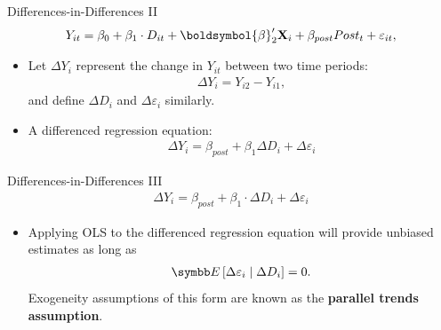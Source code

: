 \documentclass[aspectratio=169,11pt]{beamer}
\begin{document}
\begin{frame}{Differences-in-Differences II}
\begin{align*}
  Y_{it}=\beta_{0}+\beta_{1}\cdot D_{it}+\boldsymbol{\beta}_2' {\bf X}_{i} + \beta_{post}  Post_t  + \varepsilon_{it},
\end{align*}

\begin{itemize}
  \item Let $\Delta Y_{i}$ represent the change in $Y_{it}$ between two time periods:
  \begin{align*}
  \Delta Y_{i} = Y_{i2} - Y_{i1},
  \end{align*}
  and define $\Delta D_i$ and $\Delta \varepsilon_i$ similarly.

  \medskip
  \item A differenced regression equation:
  \begin{align*}
  \Delta Y_{i}=\beta_{post} + \beta_{1} \Delta D_{i}+ \Delta \varepsilon_{i}
  \end{align*}

\end{itemize}
\end{frame}


\begin{frame}{Differences-in-Differences III}
\begin{align*}
  \Delta Y_{i}=\beta_{post} + \beta_{1}  \cdot \Delta D_{i}+ \Delta \varepsilon_{i}
\end{align*}

\begin{itemize}
  \item Applying OLS to the differenced regression equation will provide unbiased
  estimates as long as
  \begin{align*}
  \E\left[ \Delta \varepsilon_{i} \mid \Delta D_{i} \right] =0.
  \end{align*}
  Exogeneity assumptions of this form are known as the {\bf parallel trends
  assumption}.

\end{itemize}
\end{frame}
\end{document}
